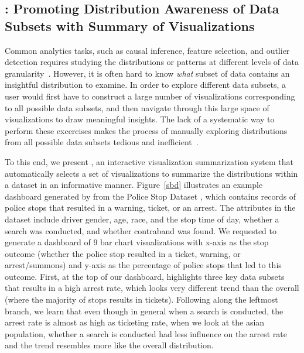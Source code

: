 \subsection{\sbd: Promoting Distribution Awareness of Data Subsets with Summary of Visualizations}
\par Common analytics tasks, such as causal inference, feature selection, and outlier detection requires studying the distributions or patterns at different levels of data granularity~\cite{Anand2015,Wu2013,Heer2012}. However, it is often hard to know \textit{what} subset of data contains an insightful distribution to examine. In order to explore different data subsets, a user would first have to construct a large number of visualizations corresponding to all possible data subsets, and then navigate through this large space of visualizations to draw meaningful insights. The lack of a systematic way to perform these excercises makes the process of manually exploring distributions from all possible data subsets tedious and inefficient~\cite{Sarawagi1998,Sarawagi2000}.
\par To this end, we present \sbd, an interactive visualization summarization system that automatically selects a set of visualizations to summarize the distributions within a dataset in an informative manner. Figure~\ref{sbd} illustrates an example dashboard generated by \sbd from the Police Stop Dataset \cite{police}, which contains records of police stops that resulted in a warning, ticket, or an arrest. The attributes in the dataset include driver gender, age, race, and the stop time of day, whether a search was conducted, and whether contraband was found. We requested \sbd to generate a dashboard of 9 bar chart visualizations with x-axis as the stop outcome (whether the police stop resulted in a ticket, warning, or arrest/summons) and y-axis as the percentage of police stops that led to this outcome. First, at the top of our dashboard, \sbd highlights three key data subsets that results in a high arrest rate, which looks very different trend than the overall (where the majority of stops results in tickets). Following along the leftmost branch, we learn that even though in general when a search is conducted, the arrest rate is almost as high as ticketing rate, when we look at the asian population, whether a search is conducted had less influence on the arrest rate and the trend resembles more like the overall distribution.
